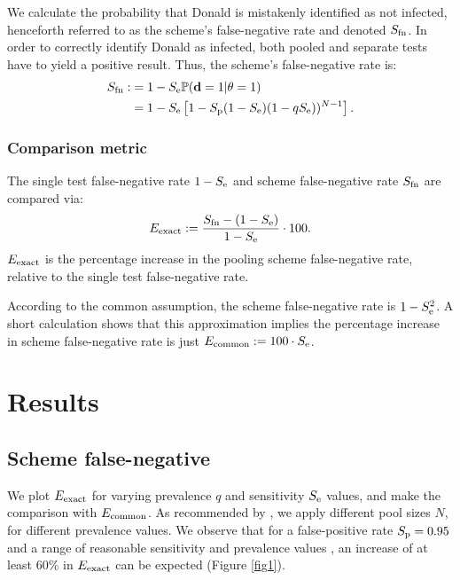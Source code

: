 \documentclass{article}
\begin{document}
We calculate the probability that Donald is mistakenly identified as
not infected, henceforth referred to as the scheme's false-negative
rate and denoted $S_{\text{fn}}$. In order to correctly identify Donald
as infected, both pooled and separate tests have to yield a positive
result. Thus, the scheme's false-negative rate is:
\begin{align}\label{eq:sfn}
    \begin{split}
        S_{\text{fn}} :&= 1 - S_\text{e}\mathbb{P}(\mathbf{d}=1|\theta=1)\\
        &= 1 - S_\text{e}\left [1 - S_\text{p}(1-S_\text{e})(1-qS_\text{e}))^{N-1}\right].
    \end{split}
\end{align}

\subsubsection{Comparison metric}
The single test false-negative rate $1-S_\text{e}$ and scheme false-negative
rate $S_{\text{fn}}$ are compared via:
\begin{equation}\label{eq:erel}
E_{\text{{exact}}} := \frac{S_{\text{fn}} - (1-S_\text{e})}{1-S_\text{e}} \cdot 100.
\end{equation}
$E_{\text{{exact}}}$ is the percentage increase in the pooling scheme false-negative
rate, relative to the single test false-negative rate.

According to the common assumption, the scheme false-negative rate is
$1-S_\text{e}^2$. A short calculation shows that this approximation implies
the percentage increase in scheme false-negative rate is just
$E_{\text{{common}}} := 100\cdot S_\text{e}$.

\section{Results}\label{section:results}
\subsection{Scheme false-negative}
We plot $E_{\text{{exact}}}$ for varying prevalence $q$ and sensitivity $S_\text{e}$
values, and make the comparison with $E_{\text{{common}}}$. As recommended by
\cite{DorfmanYuvalDor}, we apply different pool sizes $N$, for
different prevalence values. We observe that for a false-positive rate
$S_\text{p}=0.95$ \cite{DorfmanYuvalDor} and a range of reasonable
sensitivity and prevalence values \cite{KitComparison,
  InterpretingCOVID19Test, EstimatingRatesLourenco,
  FalsePositiveEstimate}, an increase of at least $60\%$ in
$E_{\text{{exact}}}$ can be expected (Figure \ref{fig1}).
\end{document}
